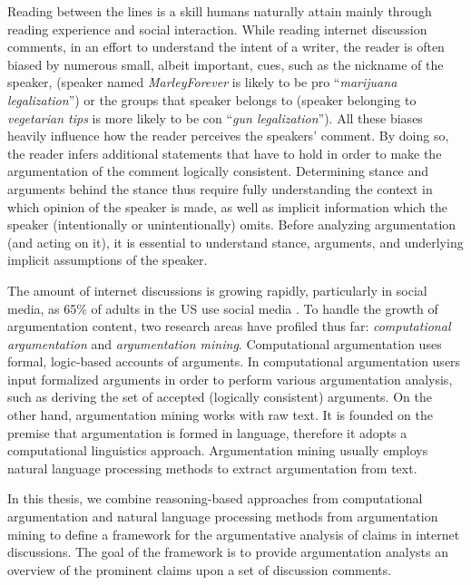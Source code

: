 Reading between the lines is a skill humans naturally attain mainly through
reading experience and social interaction. While reading internet discussion
comments, in an effort to understand the intent of a writer, the reader is
often biased by numerous small, albeit important, cues, such as the nickname
of the speaker, (speaker named \emph{MarleyForever} is likely to be pro
``\emph{marijuana legalization}'') or the groups that speaker belongs to
(speaker belonging to \emph{vegetarian tips}
 is more likely to be con ``\emph{gun legalization}'').
All these biases heavily influence how the reader perceives the speakers' comment. 
By doing so, the reader infers additional statements that have to hold
in order to make the argumentation of the comment logically consistent. 
Determining stance and arguments behind the stance thus require 
fully understanding the context in which opinion of the speaker
is made, as well as implicit information which the speaker 
(intentionally or unintentionally) omits. 
Before analyzing argumentation (and acting on it), it is essential to
understand stance, arguments, and underlying implicit assumptions of the speaker. 

The amount of internet discussions is growing rapidly, particularly in social
media, as 65\% of adults in the US use social media \citep{perrin2015social}. 
To handle the growth of argumentation content, two research areas have profiled
thus far: \textit{computational argumentation} and \emph{argumentation mining}.
Computational argumentation uses formal, logic-based accounts of arguments. In
computational argumentation users input formalized arguments in order to
perform various argumentation analysis, such as deriving the set of accepted
(logically consistent) arguments.
On the other hand, argumentation mining works with raw text.  It is founded on
the premise that argumentation is formed in language, therefore it adopts a
computational linguistics approach. 
Argumentation mining usually employs natural language processing methods to extract
argumentation from text. 

In this thesis, we combine reasoning-based approaches from
computational argumentation and natural language processing methods
from argumentation mining to define a framework for the 
argumentative analysis of claims in internet discussions. 
The goal of the framework is to provide argumentation analysts 
an overview of the prominent claims upon a set of discussion comments. 


